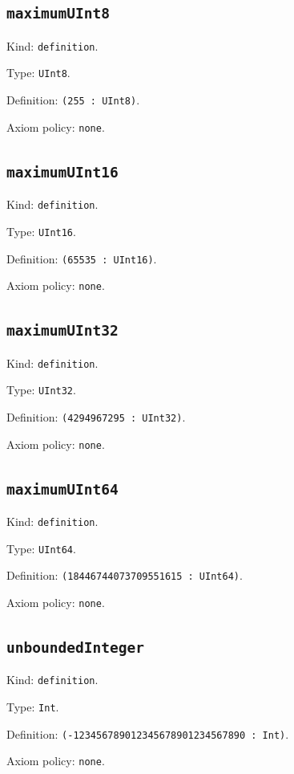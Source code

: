\documentclass[11pt]{article}
\begin{document}
\subsection*{\texttt{maximumUInt8}}
\noindent Kind: \texttt{definition}.\par
\noindent Type: \texttt{UInt8}.\par
\noindent Definition: \texttt{(255 : UInt8)}.\par
\noindent Axiom policy: \texttt{none}.\par
\subsection*{\texttt{maximumUInt16}}
\noindent Kind: \texttt{definition}.\par
\noindent Type: \texttt{UInt16}.\par
\noindent Definition: \texttt{(65535 : UInt16)}.\par
\noindent Axiom policy: \texttt{none}.\par
\subsection*{\texttt{maximumUInt32}}
\noindent Kind: \texttt{definition}.\par
\noindent Type: \texttt{UInt32}.\par
\noindent Definition: \texttt{(4294967295 : UInt32)}.\par
\noindent Axiom policy: \texttt{none}.\par
\subsection*{\texttt{maximumUInt64}}
\noindent Kind: \texttt{definition}.\par
\noindent Type: \texttt{UInt64}.\par
\noindent Definition: \texttt{(18446744073709551615 : UInt64)}.\par
\noindent Axiom policy: \texttt{none}.\par
\subsection*{\texttt{unboundedInteger}}
\noindent Kind: \texttt{definition}.\par
\noindent Type: \texttt{Int}.\par
\noindent Definition: \texttt{(-123456789012345678901234567890 : Int)}.\par
\noindent Axiom policy: \texttt{none}.\par
\end{document}
